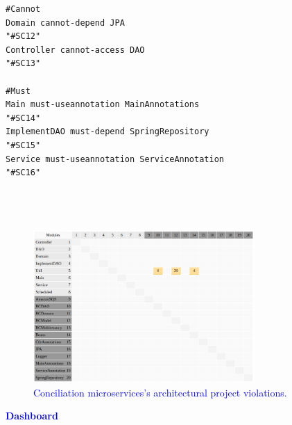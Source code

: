 \documentclass[12pt]{article}
\begin{document}
\begin{lstlisting}[style=colorido, caption={\textcolor{blue}{Conciliation microservice's architectural project specification.}},label={list:especArquiteturalConciliation}
]
#Cannot
Domain cannot-depend JPA																																																										"#SC12"
Controller cannot-access DAO																																																						"#SC13"

#Must
Main must-useannotation MainAnnotations																																											"#SC14"
ImplementDAO must-depend SpringRepository																																									"#SC15"
Service must-useannotation ServiceAnnotation																																						"#SC16"


	
\end{lstlisting}
\begin{figure}[ht]
\centering
\includegraphics[width=0.75\textwidth]{figuras/violacoesConciliation.png}
\caption{\textcolor{blue}{Conciliation microservices's architectural project violations.}}
\label{fig:microservices}
\end{figure}

\newpage
\noindent\textbf{\large{\textcolor{blue}{Dashboard}}}
\label{sec:ApendiceDashboard}
\end{document}
